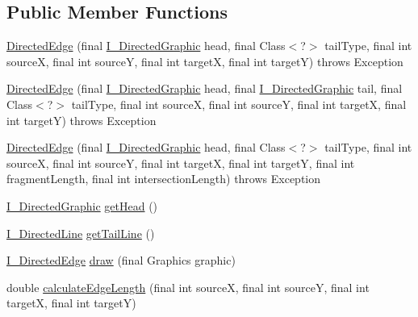 \subsection*{Public Member Functions}
\begin{DoxyCompactItemize}
\item 
\hyperlink{classorg_1_1tzi_1_1use_1_1gui_1_1views_1_1diagrams_1_1edges_1_1_directed_edge_a3787705d4387e8fa8b7f269f6ed3125e}{Directed\-Edge} (final \hyperlink{interfaceorg_1_1tzi_1_1use_1_1gui_1_1views_1_1diagrams_1_1util_1_1_i___directed_graphic}{I\-\_\-\-Directed\-Graphic} head, final Class$<$?$>$ tail\-Type, final int source\-X, final int source\-Y, final int target\-X, final int target\-Y)  throws Exception 
\item 
\hyperlink{classorg_1_1tzi_1_1use_1_1gui_1_1views_1_1diagrams_1_1edges_1_1_directed_edge_a94b2e85ff2afb8f45b87d2be945a1f3f}{Directed\-Edge} (final \hyperlink{interfaceorg_1_1tzi_1_1use_1_1gui_1_1views_1_1diagrams_1_1util_1_1_i___directed_graphic}{I\-\_\-\-Directed\-Graphic} head, final \hyperlink{interfaceorg_1_1tzi_1_1use_1_1gui_1_1views_1_1diagrams_1_1util_1_1_i___directed_graphic}{I\-\_\-\-Directed\-Graphic} tail, final Class$<$?$>$ tail\-Type, final int source\-X, final int source\-Y, final int target\-X, final int target\-Y)  throws Exception 
\item 
\hyperlink{classorg_1_1tzi_1_1use_1_1gui_1_1views_1_1diagrams_1_1edges_1_1_directed_edge_adf4bbf7d48a9e09a03bc4d611898591b}{Directed\-Edge} (final \hyperlink{interfaceorg_1_1tzi_1_1use_1_1gui_1_1views_1_1diagrams_1_1util_1_1_i___directed_graphic}{I\-\_\-\-Directed\-Graphic} head, final Class$<$?$>$ tail\-Type, final int source\-X, final int source\-Y, final int target\-X, final int target\-Y, final int fragment\-Length, final int intersection\-Length)  throws Exception 
\item 
\hyperlink{interfaceorg_1_1tzi_1_1use_1_1gui_1_1views_1_1diagrams_1_1util_1_1_i___directed_graphic}{I\-\_\-\-Directed\-Graphic} \hyperlink{classorg_1_1tzi_1_1use_1_1gui_1_1views_1_1diagrams_1_1edges_1_1_directed_edge_ad8df464af306c47b1e499185470e415f}{get\-Head} ()
\item 
\hyperlink{interfaceorg_1_1tzi_1_1use_1_1gui_1_1views_1_1diagrams_1_1util_1_1_i___directed_line}{I\-\_\-\-Directed\-Line} \hyperlink{classorg_1_1tzi_1_1use_1_1gui_1_1views_1_1diagrams_1_1edges_1_1_directed_edge_a9184776f5f05ae65be98665fac219b27}{get\-Tail\-Line} ()
\item 
\hyperlink{interfaceorg_1_1tzi_1_1use_1_1gui_1_1views_1_1diagrams_1_1edges_1_1_i___directed_edge}{I\-\_\-\-Directed\-Edge} \hyperlink{classorg_1_1tzi_1_1use_1_1gui_1_1views_1_1diagrams_1_1edges_1_1_directed_edge_a2f51d8e2e8d28307bb3e09d2f2d63d91}{draw} (final Graphics graphic)
\item 
double \hyperlink{classorg_1_1tzi_1_1use_1_1gui_1_1views_1_1diagrams_1_1edges_1_1_directed_edge_a1d51137c86beb8f2e1bbb250abb82a51}{calculate\-Edge\-Length} (final int source\-X, final int source\-Y, final int target\-X, final int target\-Y)
\end{DoxyCompactItemize}


